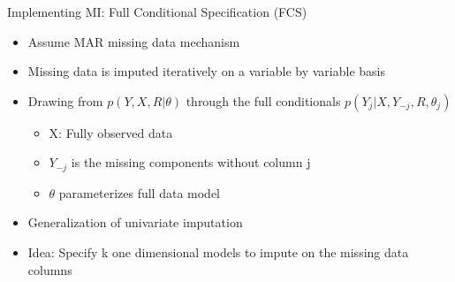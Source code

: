 \begin{frame}{Implementing MI: Full Conditional Specification (FCS)}
 \begin{itemize}
  \item Assume MAR missing data mechanism %
  \item Missing data is imputed iteratively on a variable by variable basis
  \item Drawing from $p(Y,X,R|\theta)$ through the full conditionals $p(Y_j|X,Y_{-j},R,\theta_j)$
  \begin{itemize}
   \item X: Fully observed data
   \item $Y_{-j}$ is the missing components without column j
   \item $\theta$ parameterizes full data model
  \end{itemize}

  \item Generalization of univariate imputation
  \item Idea: Specify k one dimensional models to impute on the missing data columns
 \end{itemize}

\end{frame}

